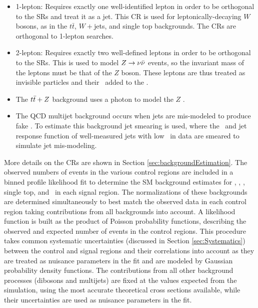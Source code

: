 \begin{itemize}
	\item 1-lepton: Requires exactly one well-identified lepton in order to be orthogonal to the SRs and treat it as a jet.  This CR is used for leptonically-decaying $W$ bosons, as in the $t\bar{t}$, $W+$jets, and single top backgrounds.  The CRs are orthogonal to 1-lepton searches. 
	\item 2-lepton: Requires exactly two well-defined leptons in order to be orthogonal to the SRs.  This is used to model $Z\rightarrow \nu \bar{\nu}$ events, so the invariant mass of the leptons must be that of the $Z$ boson.  These leptons are thus treated as invisible particles and their \pt\ added to the \met.
	\item The $t\bar{t}+Z$ background uses a photon to model the $Z$ \pt.
	\item The QCD multijet background occurs when jets are mis-modeled to produce fake \met.  To estimate this background jet smearing\cite{jetSmearing} is used, where the \pt\ and jet response function of well-measured jets with low \met\ in data are smeared to simulate jet mis-modeling.
\end{itemize} 



More details on the CRs are shown in Section \ref{sec:backgroundEstimation}.  The observed numbers of events in the various control regions are included in a binned profile likelihood fit\cite{likelihoodFit} to determine the SM background
estimates for \Zboson, \ttbar, \Wboson, single top, and \ttZ\ in each signal region. 
The normalizations of these backgrounds are determined simultaneously to best match the observed data in each control region taking contributions from all backgrounds into account. A likelihood function is built as the
product of Poisson probability functions, describing the observed and
expected number of events in the control regions\cite{histFitter}. This procedure takes common systematic uncertainties (discussed in
Section \ref{sec:Systematics}) between the control and signal regions and
their correlations into account as they are treated as nuisance
parameters in the fit and are modeled by Gaussian probability density
functions. %
The contributions from all other background processes (dibosons and multijets) are fixed at the values expected from
the simulation, using the most accurate theoretical cross sections
available, while their uncertainties are used as nuisance parameters in the fit. \\


